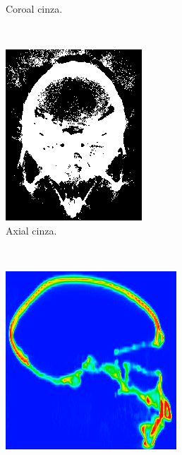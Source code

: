 \documentclass{article}
\begin{document}
\begin{figure}[h]
\begin{subfigure}[b]{0.3\textwidth}
        \caption{Coroal cinza.}
    \end{subfigure}
    ~
    \begin{subfigure}[b]{0.3\textwidth}
        \includegraphics[width=\textwidth]{skull/neuroradiologist-axial-gray.png}
        \caption{Axial cinza.}
    \end{subfigure}
    ~
    \begin{subfigure}[b]{0.3\textwidth}
        \includegraphics[width=\textwidth]{skull/neuroradiologist-sagital.png}

\end{subfigure}
\end{figure}
\end{document}
